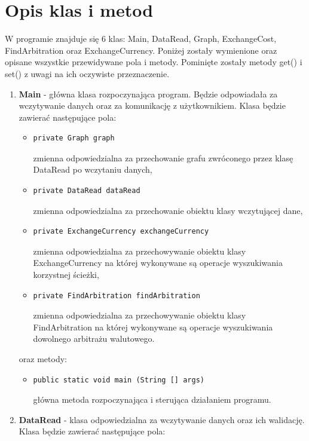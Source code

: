 ﻿\documentclass[12pt]{article}
\begin{document}
\section{Opis klas i metod}
W programie znajduje się 6 klas: Main, DataRead, Graph, ExchangeCost, FindArbitration oraz ExchangeCurrency. Poniżej zostały wymienione oraz opisane wszystkie przewidywane pola i metody. Pominięte zostały metody get() i set() z uwagi na ich oczywiste przeznaczenie.
\begin{enumerate}
\item \textbf{Main} - główna klasa rozpoczynająca program. Będzie odpowiadała za wczytywanie danych oraz za komunikację z użytkownikiem. Klasa będzie zawierać następujące pola:
    \begin{itemize}
        \item \begin{verbatim}private Graph graph\end{verbatim}
        zmienna odpowiedzialna za przechowanie grafu zwróconego przez klasę DataRead po wczytaniu danych,
    \item \begin{verbatim}private DataRead dataRead\end{verbatim}
        zmienna odpowiedzialna za przechowanie obiektu klasy wczytującej dane,
    \item \begin{verbatim}private ExchangeCurrency exchangeCurrency\end{verbatim}
        zmienna odpowiedzialna za przechowywanie obiektu klasy ExchangeCurrency na której wykonywane są operacje wyszukiwania korzystnej ścieżki,
    \item \begin{verbatim}private FindArbitration findArbitration\end{verbatim}
        zmienna odpowiedzialna za przechowywanie obiektu klasy FindArbitration na której wykonywane są operacje wyszukiwania dowolnego arbitrażu walutowego.
    \end{itemize}
    oraz metody:
    \begin{itemize}
        \item \begin{verbatim}public static void main (String [] args)\end{verbatim}
        główna metoda rozpoczynająca i sterująca działaniem programu.
    \end{itemize}
\item \textbf{DataRead} - klasa odpowiedzialna za wczytywanie danych oraz ich walidację. Klasa będzie zawierać następujące pola:

\end{enumerate}
\end{document}
